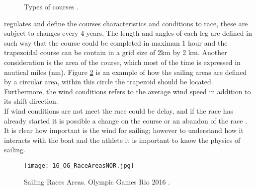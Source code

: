 \begin{figure}[ht]
  \centering
  \hfill
  \caption{Types of courses \cite{instr_rio}.}
\label{fig:typecourses} 
\end{figure}

\cite{race_pol} regulates and define the courses characteristics and conditions to race, these are subject to changes every 4 years. The length and angles of each leg are defined in such way that the course could be completed in maximun 1 hour and the trapezoidal course can be contain in a grid size of 2km by 2 km.  Another consideration is the area of the course,  which most of the time is expressed in nautical miles (nm). Figure \ref{fig:olymp_areas_rio} is an example of how the sailing areas are defined by a circular area, within this circle the trapezoid should be located. Furthermore, the wind conditions refers to the average wind speed in addition to its shift direction.\\
If wind conditions are not meet the race could be delay, and if the race has already started it is possible a change on the course or an abandon of the race \cite{race_pol}. It is clear how important is the wind for sailing; however to understand how it interacts with the boat and the athlete it is important to know the physics of sailing. \\

\begin{figure}[ht]
\centering
 \texttt{[image: 16\_OG\_RaceAreasNOR.jpg]}
  \caption{Sailing Races Areas. Olympic Games Rio 2016 \cite{instr_rio}.}
\label{fig:olymp_areas_rio} 
\end{figure}

